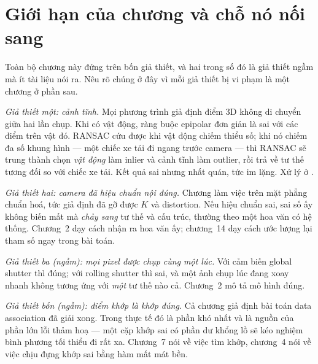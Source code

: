 \documentclass[../../vslam.tex]{subfiles}
\begin{document}
\section{Giới hạn của chương và chỗ nó nối sang}

Toàn bộ chương này đứng trên bốn giả thiết, và hai trong số đó là giả thiết ngầm mà ít tài liệu nói ra. Nêu rõ chúng ở đây vì mỗi giả thiết bị vi phạm là một chương ở phần sau.

\emph{Giả thiết một: cảnh tĩnh.} Mọi phương trình giả định điểm \(3\)D không di chuyển giữa hai lần chụp. Khi có vật động, ràng buộc epipolar đơn giản là sai với các điểm trên vật đó. RANSAC cứu được khi vật động chiếm thiểu số; khi nó chiếm đa số khung hình --- một chiếc xe tải đi ngang trước camera --- thì RANSAC sẽ trung thành chọn \emph{vật động} làm inlier và cảnh tĩnh làm outlier, rồi trả về tư thế tương đối so với chiếc xe tải. Kết quả sai nhưng nhất quán, tức im lặng. Xử lý ở .

\emph{Giả thiết hai: camera đã hiệu chuẩn nội đúng.} Chương làm việc trên mặt phẳng chuẩn hoá, tức giả định đã gỡ được \(K\) và distortion. Nếu hiệu chuẩn sai, sai số ấy không biến mất mà \emph{chảy sang} tư thế và cấu trúc, thường theo một hoa văn có hệ thống. Chương~2 dạy cách nhận ra hoa văn ấy; chương~14 dạy cách ước lượng lại tham số ngay trong bài toán.

\emph{Giả thiết ba (ngầm): mọi pixel được chụp cùng một lúc.} Với cảm biến global shutter thì đúng; với rolling shutter thì sai, và một ảnh chụp lúc đang xoay nhanh không tương ứng với \emph{một} tư thế nào cả. Chương~2 mô tả mô hình đúng.

\emph{Giả thiết bốn (ngầm): điểm khớp là khớp đúng.} Cả chương giả định bài toán data association đã giải xong. Trong thực tế đó là phần khó nhất và là nguồn của phần lớn lỗi thảm hoạ --- một cặp khớp sai có phần dư khổng lồ sẽ kéo nghiệm bình phương tối thiểu đi rất xa. Chương~7 nói về việc tìm khớp, chương~4 nói về việc chịu đựng khớp sai bằng hàm mất mát bền.

\begin{ungdung}
\end{ungdung}
\end{document}
